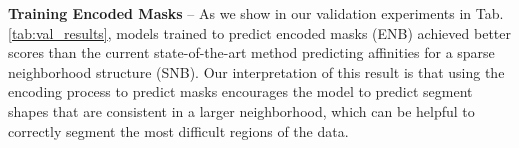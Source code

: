 \textbf{Training Encoded Masks} -- As we show in our validation experiments in Tab. \ref{tab:val_results}, models trained to predict encoded \maskname masks (ENB) achieved better scores than the current state-of-the-art method predicting affinities for a sparse neighborhood structure (SNB). 
Our interpretation of this result is that using the encoding process to predict \maskname masks encourages the model to predict segment shapes that are consistent in a larger neighborhood, which can be helpful to correctly segment the most difficult regions of the data. 


